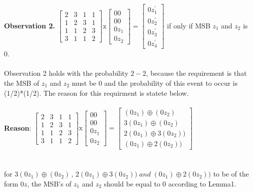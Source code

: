 \documentclass[preprint]{transcrypto}
\begin{document}
\textbf{Observation 2.} 
\begin{math}
\begin{bmatrix}
2&3&1&1\\
1&2&3&1\\
1&1&2&3\\
3&1&1&2
\end{bmatrix}
\text{x}
\begin{bmatrix}
00 \\
00 \\
0z_{1} \\
0z_{2} 
\end{bmatrix} = 
\begin{bmatrix}
0z^{'}_{1} \\
0z^{'}_{2} \\
0z^{'}_{3} \\
0z^{'}_{4} 
\end{bmatrix}
\end{math} if only if MSB $z_{1}$ and $z_{2}$ is 0. \\ \\
Observation 2 holds with the probability $2-2$, because the requirement is that the MSB of $z_{1}$ and $z_{2}$ must be 0 and the probability of this event to occur is (1/2)*(1/2). The reason for this requirment is statete below.\\ \\
\textbf{Reason}: 
\begin{math}
\begin{bmatrix}
2&3&1&1\\
1&2&3&1\\
1&1&2&3\\
3&1&1&2
\end{bmatrix}
\text{x}
\begin{bmatrix}
00 \\
00 \\
0z_{1} \\
0z_{2} 
\end{bmatrix} = 
\begin{bmatrix}
(0z_{1}) \oplus (0z_{2})\\
3(0z_{1}) \oplus (0z_{2}) \\
2(0z_{1}) \oplus 3(0z_{2})) \\
(0z_{1}) \oplus 2(0z_{2}))
\end{bmatrix}
\end{math}\\ \\ \\
for $3(0z_{1}) \oplus (0z_{2})\,,\,2(0z_{1}) \oplus 3(0z_{2}))\; and\; (0z_{1}) \oplus 2(0z_{2}))$ to be of the form $0z$, the MSB's of $z_{1}$ and $z_{2}$ should be equal to 0 according to Lemma1.
\end{document}

